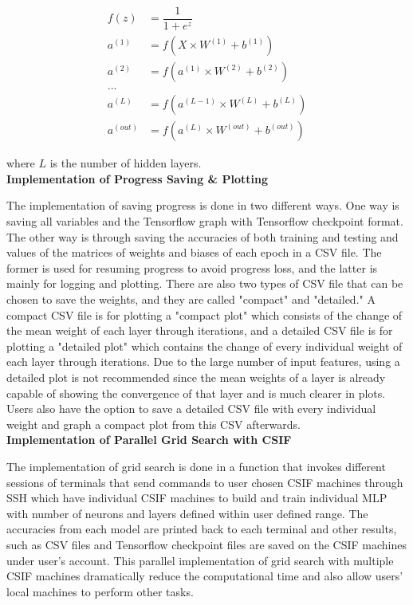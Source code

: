 \documentclass[12pt]{article}
\begin{document}
\begin{align}
f(z) &= \dfrac{1}{1+e^z}  \\
a^{(1)} &= f(X \times W^{(1)} + b^{(1)}) \\
a^{(2)} &= f(a^{(1)} \times W^{(2)} + b^{(2)})\\
... \\
a^{(L)} &= f(a^{(L-1)} \times W^{(L)} + b^{(L)})\\
a^{(out)} &= f(a^{(L)} \times W^{(out)} + b^{(out)})
\end{align}

where $L$ is the number of hidden layers. \\ 


\textbf{Implementation of Progress Saving \& Plotting}

\quad The implementation of saving progress is done in two different ways. One way is saving all variables and the Tensorflow graph with Tensorflow checkpoint format. The other way is through saving the accuracies of both training and testing and values of the matrices of weights and biases of each epoch in a CSV file. The former is used for resuming progress to avoid progress loss, and the latter is mainly for logging and plotting. There are also two types of CSV file that can be chosen to save the weights, and they are called "compact" and "detailed." A compact CSV file is for plotting a "compact plot" which consists of the change of the mean weight of each layer through iterations, and a detailed CSV file is for plotting a "detailed plot" which contains the change of every individual weight of each layer through iterations. Due to the large number of input features, using a detailed plot is not recommended since the mean weights of a layer is already capable of showing the convergence of that layer and is much clearer in plots. Users also have the option to save a detailed CSV file with every individual weight and graph a compact plot from this CSV afterwards. \\ 


\textbf{Implementation of Parallel Grid Search with CSIF}

\quad The implementation of grid search is done in a function that invokes different sessions of terminals that send commands to user chosen CSIF machines through SSH which have individual CSIF machines to build and train individual MLP with number of neurons and layers defined within user defined range. The accuracies from each model are printed back to each terminal and other results, such as CSV files and Tensorflow checkpoint files are saved on the CSIF machines under user's account. This parallel implementation of grid search with multiple CSIF machines dramatically reduce the computational time and also allow users' local machines to perform other tasks. \\
\end{document}

